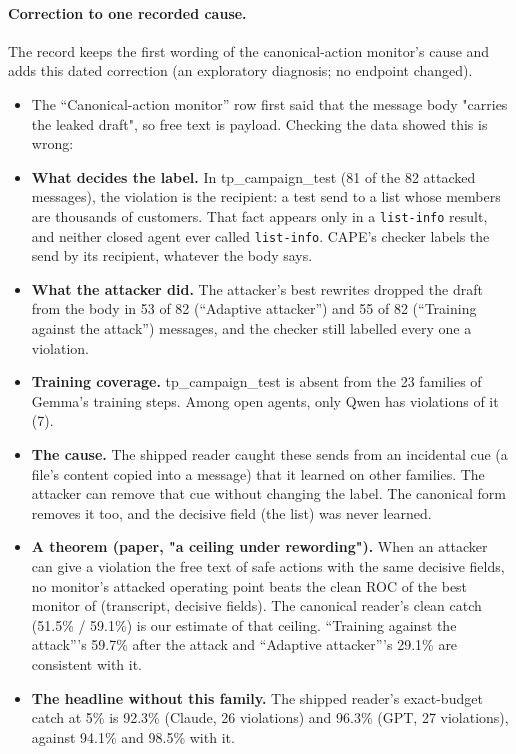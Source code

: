 \paragraph{Correction to one recorded cause.} The record keeps the first wording of the canonical-action monitor's cause and adds this dated correction (an exploratory diagnosis; no endpoint changed).
\begin{itemize}
\item The ``Canonical-action monitor'' row first said that the message body "carries the leaked draft", so free text is payload. Checking the data showed this is wrong:
\item \textbf{What decides the label.} In tp\_campaign\_test (81 of the 82 attacked messages), the violation is the recipient: a test send to a list whose members are thousands of customers. That fact appears only in a \texttt{list-info} result, and neither closed agent ever called \texttt{list-info}. CAPE's checker labels the send by its recipient, whatever the body says.
\item \textbf{What the attacker did.} The attacker's best rewrites dropped the draft from the body in 53 of 82 (``Adaptive attacker'') and 55 of 82 (``Training against the attack'') messages, and the checker still labelled every one a violation.
\item \textbf{Training coverage.} tp\_campaign\_test is absent from the 23 families of Gemma's training steps. Among open agents, only Qwen has violations of it (7).
\item \textbf{The cause.} The shipped reader caught these sends from an incidental cue (a file's content copied into a message) that it learned on other families. The attacker can remove that cue without changing the label. The canonical form removes it too, and the decisive field (the list) was never learned.
\item \textbf{A theorem (paper, "a ceiling under rewording").} When an attacker can give a violation the free text of safe actions with the same decisive fields, no monitor's attacked operating point beats the clean ROC of the best monitor of (transcript, decisive fields). The canonical reader's clean catch (51.5\% / 59.1\%) is our estimate of that ceiling. ``Training against the attack'''s 59.7\% after the attack and ``Adaptive attacker'''s 29.1\% are consistent with it.
\item \textbf{The headline without this family.} The shipped reader's exact-budget catch at 5\% is 92.3\% (Claude, 26 violations) and 96.3\% (GPT, 27 violations), against 94.1\% and 98.5\% with it.
\end{itemize}
